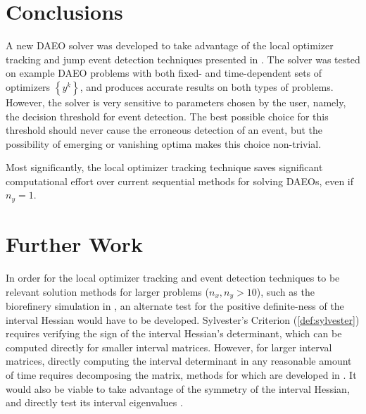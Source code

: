 \documentclass[twoside,leqno, twocolumn]{article}
\begin{document}

\section{Conclusions}
A new DAEO solver was developed to take advantage of the local optimizer tracking and jump event detection techniques presented in \cite{deussenNumericalSimulationDifferentialalgebraic2023}. The solver was tested on example DAEO problems with both fixed- and time-dependent sets of optimizers $\left\{y^k\right\}$, and produces accurate results on both types of problems. However, the solver is very sensitive to parameters chosen by the user, namely, the decision threshold for event detection. The best possible choice for this threshold should never cause the erroneous detection of an event, but the possibility of emerging or vanishing optima makes this choice non-trivial.

Most significantly, the local optimizer tracking technique saves significant computational effort over current sequential methods for solving DAEOs\cite{bieglerNonlinearProgrammingConcepts2010, plochDirectSingleShooting2022, plochMultiscaleDynamicModeling2019}, even if $n_y = 1$. 

\section{Further Work}

In order for the local optimizer tracking and event detection techniques to be relevant solution methods for larger problems ($n_x, n_y > 10$), such as the biorefinery simulation in \cite{plochMultiscaleDynamicModeling2019}, an alternate test for the positive definite-ness of the interval Hessian would have to be developed. Sylvester's Criterion (\ref{def:sylvester}) requires verifying the sign of the interval Hessian's determinant, which can be computed directly for smaller interval matrices. However, for larger interval matrices, directly computing the interval determinant in any reasonable amount of time requires decomposing the matrix, methods for which are developed in \cite{goldsztejnGeneralizedIntervalLU2007, neumaierIntervalMethodsSystems1990a}. It would also be viable to take advantage of the symmetry of the interval Hessian, and directly test its interval eigenvalues \cite{deifIntervalEigenvalueProblem1991}.
\end{document}
